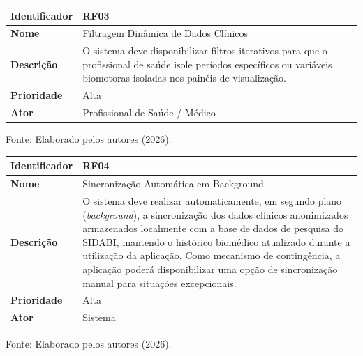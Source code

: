\begin{quadro}[H]
\centering
\caption{Especificação do Requisito Funcional 03 (RF03) - Filtragem Dinâmica}
\label{quadro:rf03}
\begin{tabular}{|l|p{11cm}|}
\hline
\textbf{Identificador} & \textbf{RF03} \\ \hline
\textbf{Nome} & Filtragem Dinâmica de Dados Clínicos \\ \hline
\textbf{Descrição} & O sistema deve disponibilizar filtros iterativos para que o profissional de saúde isole períodos específicos ou variáveis biomotoras isoladas nos painéis de visualização. \\ \hline
\textbf{Prioridade} & Alta \\ \hline
\textbf{Ator} & Profissional de Saúde / Médico \\ \hline
\end{tabular}
\centerline{\footnotesize Fonte: Elaborado pelos autores (2026).}
\end{quadro}

\begin{quadro}[H]
\centering
\caption{Especificação do Requisito Funcional 04 (RF04) - Sincronização Automática em Background}
\label{quadro:rf04}
\begin{tabular}{|l|p{11cm}|}
\hline
\textbf{Identificador} & \textbf{RF04} \\ \hline
\textbf{Nome} & Sincronização Automática em Background \\ \hline
\textbf{Descrição} & O sistema deve realizar automaticamente, em segundo plano (\textit{background}), a sincronização dos dados clínicos anonimizados armazenados localmente com a base de dados de pesquisa do SIDABI, mantendo o histórico biomédico atualizado durante a utilização da aplicação. Como mecanismo de contingência, a aplicação poderá disponibilizar uma opção de sincronização manual para situações excepcionais. \\ \hline
\textbf{Prioridade} & Alta \\ \hline
\textbf{Ator} & Sistema \\ \hline
\end{tabular}
\centerline{\footnotesize Fonte: Elaborado pelos autores (2026).}
\end{quadro}

